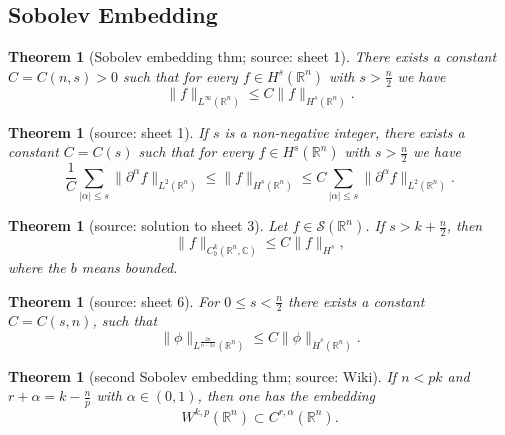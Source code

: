 \documentclass[12pt,a4paper]{article}
\newtheorem{thm}[definition]{Theorem}
\newcommand{\Rn}{\mathbb{R}^n}
\begin{document}
\subsection{Sobolev Embedding}

\begin{thm}[Sobolev embedding thm; source: sheet 1]
There exists a constant $C=C(n,s)>0$ such that for every $f\in H^s(\mathbb{R}^n)$ with $s>\frac{n}{2}$ we have
\begin{equation}
\lVert f \rVert_{L^{\infty}(\mathbb{R}^n)} \leq C \lVert f \rVert _{H^s(\mathbb{R}^n)}.
\end{equation}
\end{thm}

\begin{thm}[source: sheet 1]
If $s$ is a non-negative integer, there exists a constant $C=C(s)$ such that for every $f\in H^s(\mathbb{R}^n)$ with $s>\frac{n}{2}$ we have
\begin{equation}
\frac{1}{C} \sum_{\lvert\alpha\rvert\leq s} \lVert \partial ^{\alpha} f \rVert_{L^2(\mathbb{R}^n)} \leq \lVert f \rVert _{H^s(\mathbb{R}^n)} \leq C \sum_{\lvert\alpha\rvert\leq s} \lVert \partial ^{\alpha} f \rVert_{L^2(\mathbb{R}^n)}.
\end{equation}
\end{thm}

\begin{thm}[source: solution to sheet 3]
Let $f \in \mathcal{S}(\mathbb{R}^n)$. If $s>k+\frac{n}{2}$, then
\begin{equation}
\lVert f \rVert_{C_b^k(\Rn,\mathbb{C})}\leq C \lVert f \rVert_{H^s},
\end{equation}
where the $b$ means bounded.
\end{thm}

\begin{thm}[source: sheet 6]
For $0\leq s<\frac{n}{2}$ there exists a constant $C=C(s,n)$, such that
\begin{equation}
\lVert \phi \rVert_{L^{\frac{2n}{n-2s}}(\Rn)} \leq C\lVert \phi \rVert_{\dot H^s(\Rn)}.
\end{equation}
\end{thm}

\begin{thm}[second Sobolev embedding thm; source: Wiki]
If $n<pk$ and $r+\alpha=k-\frac{n}{p}$ with $\alpha \in (0,1)$, then one has the embedding
\begin{equation}
W^{k,p}(\mathbb{R}^n) \subset C^{r,\alpha}(\mathbb{R}^n).
\end{equation}
\end{thm}
\end{document}
